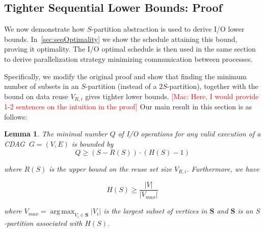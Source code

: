 \documentclass[sigplan,review,anonymous]{acmart}\settopmatter{printfolios=true,printccs=false,printacmref=false}
\newcommand\greg[1]{\textcolor{blue}{[Greg: #1]}}
\newcommand\mac[1]{\textcolor{red}{[Mac: #1]}}
\DeclareMathOperator*{\argmax}{arg\,max}
\newtheorem{lma}{Lemma}
\newcommand{\macb}[1]{\textbf{\textsf{#1}}}
\begin{document}
\subsection{Tighter Sequential Lower Bounds: Proof}
\label{sec:seq-proof}

%

We now demonstrate how $S$-partition abstraction is used to derive I/O lower 
bounds. In~\cref{sec:seqOptimality} we show the schedule 
attaining this 
bound, proving it optimality. The I/O optimal schedule is then used in the same 
section to derive parallelization strategy minimizing communication between 
processes. 


Specifically, we modify the original proof and show that finding the minimum
number of subsets in an $S$-partition (instead of a $2S$-partition), together 
with the bound on data reuse $V_{R,i}$ gives
tighter lower bounds.
%
%
\mac{Here, I would provide 1-2 sentences on the intuition in the proof}
%
Our main result in this section is as follows:

\begin{lma}
  \label{lma:reuse}
%
The minimal number $Q$ of I/O operations for any valid execution of a CDAG 
$\ G=(V,E)$ is bounded by  
%
\begin{equation}
%
Q \ge (S - R(S)) \cdot (H(S) - 1)
%
\label{eq:reusebound} \end{equation}

\noindent
where $R(S)$ is the upper bound on the reuse set size $V_{R,i}$. Furthermore, 
we have

\begin{equation}\label{eq:reusebound-pmax}
H(S) \ge \frac{|V|}{|V_{max}|}
\end{equation}

\noindent
where $V_{max} = \argmax_{V_i \in \mathcal{\mathbf{S}}}|V_i|$ is the largest 
subset
of vertices in $\mathcal{\mathbf{S}}$ and $\mathcal{\mathbf{S}}$ is an
$S$-partition associated with $H(S)$.

% 
%
\end{lma}
\end{document}
